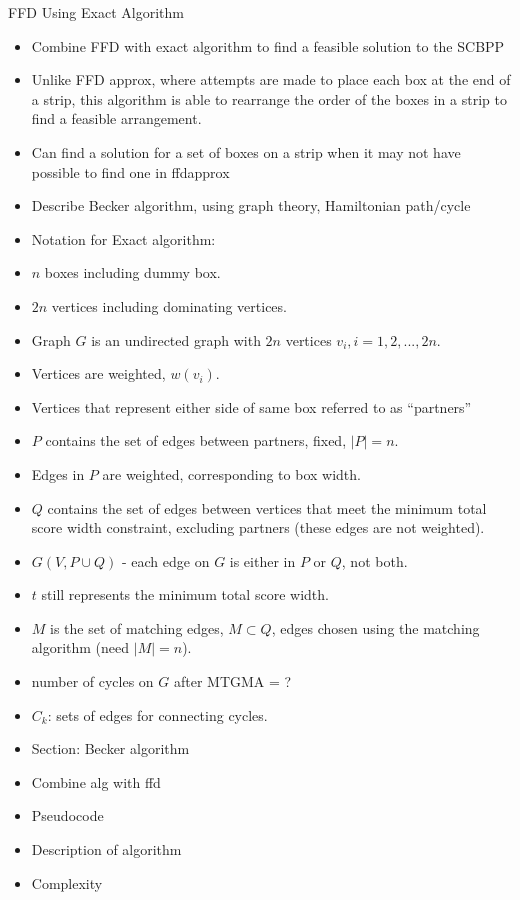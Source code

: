 \documentclass[oribibl]{llncs}
\begin{document}
FFD Using Exact Algorithm
\begin{itemize}
	\item Combine FFD with exact algorithm to find a feasible solution to the SCBPP
	\item Unlike FFD approx, where attempts are made to place each box at the end of a strip, this algorithm is able to rearrange the order of the boxes in a strip to find a feasible arrangement.
	\item Can find a solution for a set of boxes on a strip when it may not have possible to find one in ffdapprox
	\item Describe Becker algorithm, using graph theory, Hamiltonian path/cycle
	\item Notation for Exact algorithm:
	\item $n$ boxes including dummy box.
	\item $2n$ vertices including dominating vertices.
	\item Graph $G$ is an undirected graph with $2n$ vertices $v_i, i = 1, 2, ...,2n$.
	\item Vertices are weighted, $w(v_i)$.
	\item Vertices that represent either side of same box referred to as ``partners''
	\item $P$ contains the set of edges between partners, fixed, $|P| = n$.
	\item Edges in $P$ are weighted, corresponding to box width.
	\item $Q$ contains the set of edges between vertices that meet the minimum total score width constraint, excluding partners (these edges are not weighted).
	\item $G(V, P \cup Q)$ - each edge on $G$ is either in $P$ or $Q$, not both.
	\item $t$ still represents the minimum total score width.
	\item $M$ is the set of matching edges, $M \subset Q$, edges chosen using the matching algorithm (need $|M| = n$).
	\item number of cycles on $G$ after MTGMA =  ?
	\item $C_k$: sets of edges for connecting cycles.
	\item Section: Becker algorithm
	\item Combine alg with ffd
	\item Pseudocode
	\item Description of algorithm
	\item Complexity
\end{itemize}
\end{document}
